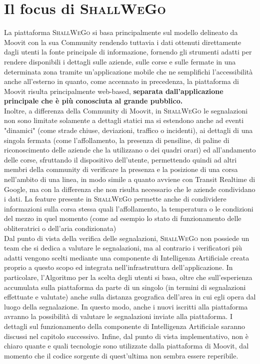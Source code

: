 \newpage
\section{Il focus di \textsc{ShallWeGo}}
    La piattaforma \textsc{ShallWeGo} si basa principalmente sul modello delineato da Moovit con la sua Community rendendo tuttavia i dati ottenuti direttamente dagli utenti la fonte principale di informazione, fornendo gli strumenti adatti per rendere disponibili i dettagli sulle aziende, sulle corse e sulle fermate in una determinata zona tramite un'applicazione mobile che ne semplifichi l'accessibilità anche all'esterno in quanto, come accennato in precedenza, la piattaforma di Moovit risulta principalmente web-based, \textbf{separata dall'applicazione principale che è più conosciuta al grande pubblico.} \\
    Inoltre, a differenza della Community di Moovit, in \textsc{ShallWeGo} le segnalazioni non sono limitate solamente a dettagli statici ma si estendono anche ad eventi "dinamici" (come strade chiuse, deviazioni, traffico o incidenti), ai dettagli di una singola fermata (come l'affollamento, la presenza di pensiline, di paline di riconoscimento delle aziende che la utilizzano o dei quadri orari) ed all'andamento delle corse, sfruttando il dispositivo dell'utente, permettendo quindi ad altri membri della community di verificare la presenza e la posizione di una corsa nell'ambito di una linea, in modo simile a quanto avviene con Transit Realtime di Google, ma con la differenza che non risulta necessario che le aziende condividano i dati. La feature presente in \textsc{ShallWeGo} permette anche di condividere informazioni sulla corsa stessa quali l'affollamento, la temperatura o le condizioni del mezzo in quel momento (come ad esempio lo stato di funzionamento delle obliteratrici o dell'aria condizionata) \\
    Dal punto di vista della verifica delle segnalazioni, \textsc{ShallWeGo} non possiede un team che si dedica a valutare le segnalazioni, ma al contrario i verificatori più adatti vengono scelti mediante una componente di Intelligenza Artificiale creata proprio a questo scopo ed integrata nell'infrastruttura dell'applicazione. In particolare, l'Algoritmo per la scelta degli utenti si basa, oltre che sull'esperienza accumulata sulla piattaforma da parte di un singolo (in termini di segnalazioni effettuate e valutate) anche sulla distanza geografica dell'area in cui egli opera dal luogo della segnalazione. In questo modo, anche i nuovi iscritti alla piattaforma avranno la possibilità di valutare le segnalazioni inviate alla piattaforma. I dettagli sul funzionamento della componente di Intelligenza Artificiale saranno discussi nel capitolo successivo. Infine, dal punto di vista implementativo, non è chiaro quante e quali tecnologie sono utilizzate dalla piattaforma di Moovit, dal momento che il codice sorgente di quest'ultima non sembra essere reperibile.